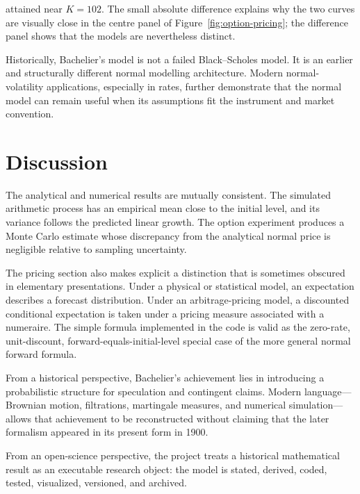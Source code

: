 \documentclass[11pt,a4paper]{article}
\begin{document}
attained near \(K=102\). The small absolute difference explains why the two curves are visually close in the centre panel of Figure~\ref{fig:option-pricing}; the difference panel shows that the models are nevertheless distinct.

Historically, Bachelier's model is not a failed Black--Scholes model. It is an earlier and structurally different normal modelling architecture. Modern normal-volatility applications, especially in rates, further demonstrate that the normal model can remain useful when its assumptions fit the instrument and market convention.

\section{Discussion}

The analytical and numerical results are mutually consistent. The simulated arithmetic process has an empirical mean close to the initial level, and its variance follows the predicted linear growth. The option experiment produces a Monte Carlo estimate whose discrepancy from the analytical normal price is negligible relative to sampling uncertainty.

The pricing section also makes explicit a distinction that is sometimes obscured in elementary presentations. Under a physical or statistical model, an expectation describes a forecast distribution. Under an arbitrage-pricing model, a discounted conditional expectation is taken under a pricing measure associated with a numeraire. The simple formula implemented in the code is valid as the zero-rate, unit-discount, forward-equals-initial-level special case of the more general normal forward formula.

From a historical perspective, Bachelier's achievement lies in introducing a probabilistic structure for speculation and contingent claims. Modern language---Brownian motion, filtrations, martingale measures, and numerical simulation---allows that achievement to be reconstructed without claiming that the later formalism appeared in its present form in 1900.

From an open-science perspective, the project treats a historical mathematical result as an executable research object: the model is stated, derived, coded, tested, visualized, versioned, and archived.

\end{document}
